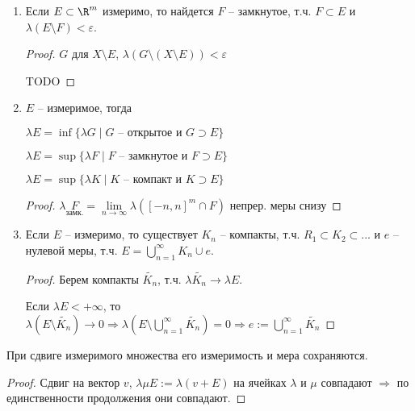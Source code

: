 \begin{corollary}
    \begin{enumerate}
        \item Если $E\subset \R^m$ измеримо, то найдется $F$ – замкнутое, т.ч. 
        $F\subset E$ и $\lambda (E\setminus F)< \varepsilon$.

        \begin{proof}
            $G$ для $X\setminus E$, $\lambda (G\setminus (X\setminus E))< \varepsilon$

            TODO
        \end{proof}

        \item $E$ – измеримое, тогда 
        
        $\lambda E =\inf \{\lambda G\mid G\text{ – открытое и } G\supset E\}$

        $\lambda E = \sup \{\lambda F\mid F\text{ – замкнутое и } F\supset E\}$

        $\lambda E = \sup \{\lambda K\mid K\text{ – компакт и } K\supset E\}$

        \begin{proof}
            $\lambda \underset{\text{замк.}}{F}=\lim\limits_{n\rightarrow \infty} \lambda ([-n, n]^m \cap F)$ непрер. меры снизу
        \end{proof}
        
        \item Если $E$ – измеримо, то существует $K_n$ – компакты, т.ч. $R_1 \subset K_2 \subset ...$ и $e$ – нулевой
        меры, т.ч. $E=\bigcup\limits_{n=1}^\infty K_n\cup e$.

        \begin{proof}
            Берем компакты $\tilde{K_n}$, т.ч. $\lambda\tilde{K_n} \rightarrow \lambda E$.

            Если $\lambda E<+\infty $, то $\lambda (E\setminus \tilde{K_n})\rightarrow 0\Rightarrow \lambda (E\setminus \bigcup\limits_{n=1}^\infty \tilde{K_n}) = 0
            \Rightarrow e:=\bigcup\limits_{n=1}^\infty \tilde{K_n}$
        \end{proof}
    \end{enumerate}
\end{corollary}

\begin{theorem}
    При сдвиге измеримого множества его измеримость и мера сохраняются. 
\end{theorem}

\begin{proof}
    Сдвиг на вектор $v$, $\lambda \mu E:=\lambda (v + E)$ на ячейках 
    $\lambda$ и $\mu$ совпадают $\Rightarrow$ по единственности продолжения они совпадают.
\end{proof}

